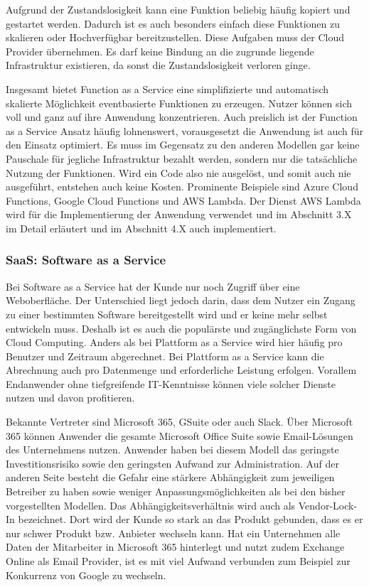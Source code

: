    Aufgrund der Zustandslosigkeit kann eine Funktion beliebig häufig kopiert und gestartet werden.
   Dadurch ist es auch besonders einfach diese Funktionen zu skalieren oder Hochverfügbar bereitzustellen. Diese Aufgaben muss der Cloud Provider übernehmen.
   Es darf keine Bindung an die zugrunde liegende Infrastruktur existieren, da sonst die Zustandslosigkeit verloren ginge.

   Insgesamt bietet Function as a Service eine simplifizierte und automatisch skalierte Möglichkeit eventbasierte Funktionen zu erzeugen.
   Nutzer können sich voll und ganz auf ihre Anwendung konzentrieren.
   Auch preislich ist der Function as a Service Ansatz häufig lohnenswert, vorausgesetzt die Anwendung ist auch für den Einsatz optimiert.
   Es muss im Gegensatz zu den anderen Modellen gar keine Pauschale für
   jegliche Infrastruktur bezahlt werden, sondern nur die tatsächliche Nutzung der Funktionen. Wird ein Code also nie ausgelöst, und somit auch nie ausgeführt,
   entstehen auch keine Kosten.
   Prominente Beispiele sind Azure Cloud Functions, Google Cloud Functions und AWS Lambda.
   Der Dienst AWS Lambda wird für die Implementierung der Anwendung verwendet und im Abschnitt 3.X im Detail erläutert und im Abschnitt 4.X auch
   implementiert.\cite[]{AWSWhitepaper}

   \subsubsection{SaaS: Software as a Service}
   Bei Software as a Service hat der Kunde nur noch Zugriff über eine Weboberfläche. Der Unterschied liegt jedoch darin, dass dem Nutzer
   ein Zugang zu einer bestimmten Software bereitgestellt wird und er keine mehr selbst entwickeln muss. Deshalb ist es auch die populärste und
   zugänglichste Form von Cloud Computing. Anders als bei Plattform as a Service wird hier häufig pro Benutzer und Zeitraum abgerechnet. Bei Plattform
   as a Service kann die Abrechnung auch pro Datenmenge und erforderliche Leistung erfolgen.
   Vorallem Endanwender ohne tiefgreifende IT-Kenntnisse können viele solcher Dienste nutzen und davon profitieren. \cite[]{SaaS}

   Bekannte Vertreter sind Microsoft 365, GSuite oder auch Slack. Über Microsoft 365 können Anwender die gesamte Microsoft Office Suite sowie Email-Lösungen des Unternehmens nutzen.
   Anwender haben bei diesem Modell das geringste Investitionsrisiko sowie den geringsten
   Aufwand zur Administration. Auf der anderen Seite besteht die Gefahr eine stärkere Abhängigkeit zum jeweiligen Betreiber zu haben sowie weniger Anpassungsmöglichkeiten als bei den bisher vorgestellten
   Modellen.
   Das Abhängigkeitsverhältnis wird auch als Vendor-Lock-In bezeichnet. Dort wird der Kunde so stark an das Produkt gebunden, dass es er nur schwer
   Produkt bzw. Anbieter wechseln kann.
   Hat ein Unternehmen alle Daten der Mitarbeiter in Microsoft 365 hinterlegt und nutzt zudem Exchange Online als Email Provider, ist es mit viel Aufwand verbunden
   zum Beispiel zur Konkurrenz von Google zu wechseln.



